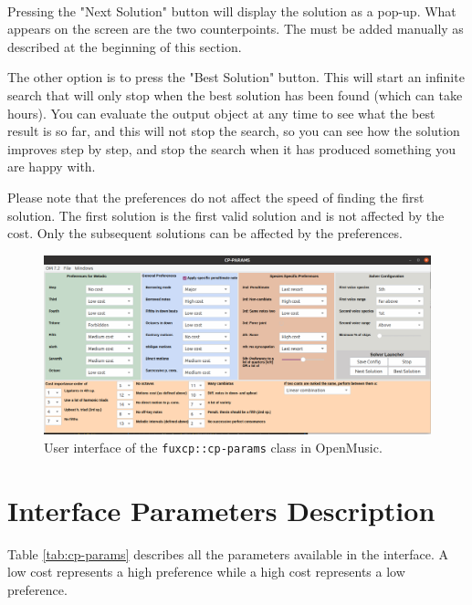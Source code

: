 \paragraph{}
Pressing the "Next Solution" button will display the solution as a pop-up. What appears on the screen are the two counterpoints. The \cfs must be added manually as described at the beginning of this section. 


The other option is to press the "Best Solution" button. This will start an infinite search that will only stop when the best solution has been found (which can take hours). You can evaluate the output object at any time to see what the best result is so far, and this will not stop the search, so you can see how the solution improves step by step, and stop the search when it has produced something you are happy with.


Please note that the preferences do not affect the speed of finding the first solution. The first solution is the first valid solution and is not affected by the cost. Only the subsequent solutions can be affected by the preferences.

\begin{figure}[h]
    \includegraphics[width=1.2\textwidth, center]{Images/om_int_interface.png}
    \caption{User interface of the \texttt{fuxcp::cp-params} class in OpenMusic.}
    \label{fig:om_int_interface}
\end{figure}

\section{Interface Parameters Description} \label{appendix:interface-parameters-description}
Table \ref{tab:cp-params} describes all the parameters available in the interface. A low cost represents a high preference while a high cost represents a low preference.

